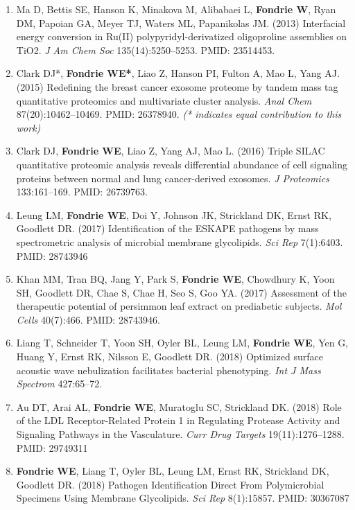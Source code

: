 \documentclass{article}
\newcommand{\mysection}[1]{\vspace{1ex}{\bf #1}}
\begin{document}
\mysection{Refereed Publications}
\begin{enumerate}
  \item Ma D, Bettis SE, Hanson K, Minakova M, Alibabaei L, {\bf Fondrie W}, Ryan DM, Papoian GA, Meyer TJ, Waters ML, Papanikolas JM. (2013) Interfacial energy conversion in Ru(II) polypyridyl-derivatized oligoproline assemblies on TiO2. \textit{J Am Chem Soc} 135(14):5250--5253. PMID: 23514453.

  \item Clark DJ*, {\bf Fondrie WE*}, Liao Z, Hanson PI, Fulton A, Mao L, Yang AJ. (2015) Redefining the breast cancer exosome proteome by tandem mass tag quantitative proteomics and multivariate cluster analysis. \textit{Anal Chem} 87(20):10462--10469. PMID: 26378940. {\it (* indicates equal contribution to this work)}

  \item Clark DJ, {\bf Fondrie WE}, Liao Z, Yang AJ, Mao L. (2016) Triple SILAC quantitative proteomic analysis reveals differential abundance of cell signaling proteins between normal and lung cancer-derived exosomes. {\it J Proteomics} 133:161--169. PMID: 26739763.

  \item Leung LM, {\bf Fondrie WE}, Doi Y, Johnson JK, Strickland DK, Ernst RK, Goodlett DR. (2017) Identification of the ESKAPE pathogens by mass spectrometric analysis of microbial membrane glycolipids. {\it Sci Rep} 7(1):6403. PMID: 28743946

  \item Khan MM, Tran BQ, Jang Y, Park S, {\bf Fondrie WE}, Chowdhury K, Yoon SH, Goodlett DR, Chae S, Chae H, Seo S, Goo YA. (2017) Assessment of the therapeutic potential of persimmon leaf extract on prediabetic subjects. {\it Mol Cells} 40(7):466. PMID: 28743946.

  \item Liang T, Schneider T, Yoon SH, Oyler BL, Leung LM, \textbf{Fondrie WE}, Yen G, Huang Y, Ernst RK, Nilsson E, Goodlett DR. (2018) Optimized surface acoustic wave nebulization facilitates bacterial phenotyping. \textit{Int J Mass Spectrom} 427:65--72.

  \item Au DT, Arai AL, \textbf{Fondrie WE}, Muratoglu SC, Strickland DK. (2018) Role of the LDL Receptor-Related Protein 1 in Regulating Protease Activity and Signaling Pathways in the Vasculature. \textit{Curr Drug Targets} 19(11):1276--1288. PMID: 29749311

  \item \textbf{Fondrie WE}, Liang T, Oyler BL, Leung LM, Ernst RK, Strickland DK, Goodlett DR. (2018) Pathogen Identification Direct From Polymicrobial Specimens Using Membrane Glycolipids. \textit{Sci Rep} 8(1):15857. PMID: 30367087


\end{enumerate}
\end{document}
